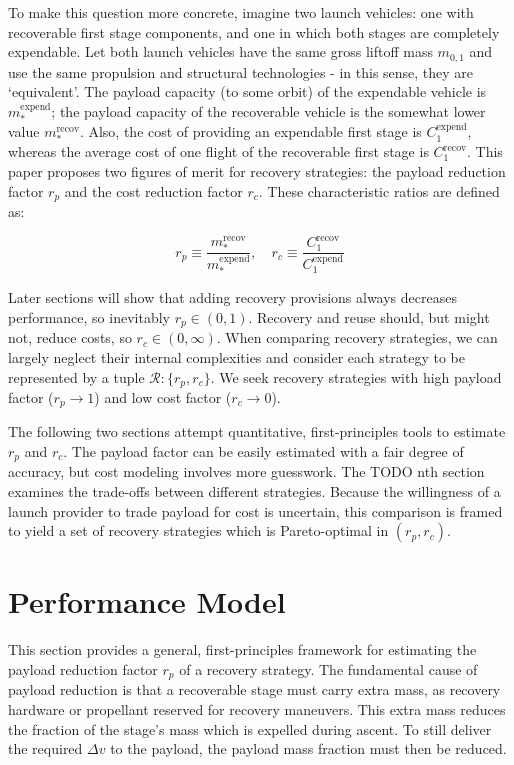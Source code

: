 \documentclass[conf]{new-aiaa}
\begin{document}
To make this question more concrete, imagine two launch vehicles: one with recoverable first stage components, and one in which both stages are completely expendable. Let both launch vehicles have the same gross liftoff mass $m_{0,1}$ and use the same propulsion and structural technologies - in this sense, they are `equivalent'. The payload capacity (to some orbit) of the expendable vehicle is $m_*^{\mathrm{expend}}$; the payload capacity of the recoverable vehicle is the somewhat lower value $m_*^{\mathrm{recov}}$. Also, the cost of providing an expendable first stage is $C_1^{\mathrm{expend}}$, whereas the average cost of one flight of the recoverable first stage is $C_1^{\mathrm{recov}}$. This paper proposes two figures of merit for recovery strategies: the payload reduction factor $r_p$ and the cost reduction factor $r_c$. These characteristic ratios are defined as:

\begin{equation}
r_p \equiv \frac{m_*^{\mathrm{recov}}}{m_*^{\mathrm{expend}}}, \quad r_c \equiv \frac{C_1^{\mathrm{recov}}}{C_1^{\mathrm{expend}}}
\end{equation}

Later sections will show that adding recovery provisions always decreases performance, so inevitably $r_p \in (0, 1)$. Recovery and reuse should, but might not, reduce costs, so $r_c \in (0, \infty)$.
When comparing recovery strategies, we can largely neglect their internal complexities and consider each strategy to be represented by a tuple $\mathcal{R}: \{r_p, r_c\}$. We seek recovery strategies with high payload factor ($r_p \rightarrow 1$) and low cost factor ($r_c \rightarrow 0$).

The following two sections attempt quantitative, first-principles tools to estimate $r_p$ and $r_c$. The payload factor can be easily estimated with a fair degree of accuracy, but cost modeling involves more guesswork. The TODO nth section examines the trade-offs between different strategies. Because the willingness of a launch provider to trade payload for cost is uncertain, this comparison is framed to yield a set of recovery strategies which is Pareto-optimal in $(r_p, r_c)$.




\section{Performance Model}
This section provides a general, first-principles framework for estimating the payload reduction factor $r_p$ of a recovery strategy. The fundamental cause of payload reduction is that a recoverable stage must carry extra mass, as recovery hardware or propellant reserved for recovery maneuvers. This extra mass reduces the fraction of the stage's mass which is expelled during ascent. To still deliver the required $\Delta v$ to the payload, the payload mass fraction must then be reduced.
\end{document}
